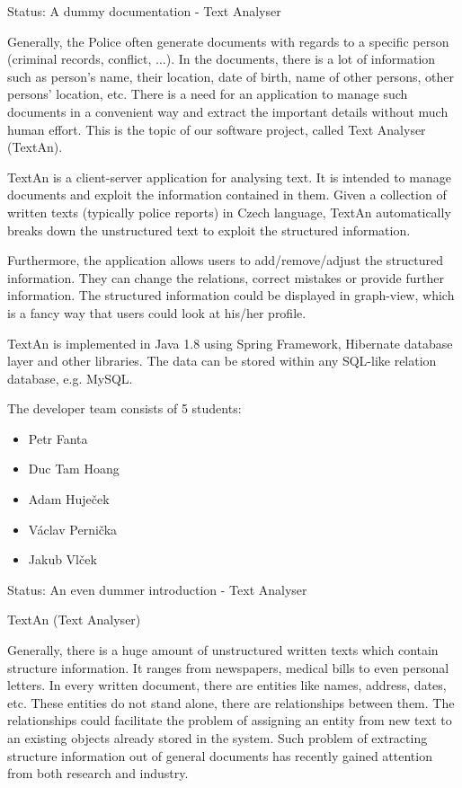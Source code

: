 Status: A dummy documentation - Text Analyser

Generally, the Police often generate documents with regards to a specific person (criminal records, conflict, ...). 
In the documents, there is a lot of information such as
person's name, their location, date of birth, name of other persons, other persons' location, etc.
There is a need for an application to manage such documents in a convenient way and extract the important details without much human effort.
This is the topic of our software project, called Text Analyser (TextAn).

TextAn is a client-server application for analysing text.
It is intended to manage documents and exploit the information contained in them.
Given a collection of written texts (typically police reports) in Czech language,
TextAn automatically breaks down the unstructured text to exploit the structured information. 

Furthermore, the application allows users to add/remove/adjust the structured information.
They can change the relations, correct mistakes or provide further information.
The structured information could be displayed in graph-view,
which is a fancy way that users could look at his/her profile. 

TextAn is implemented in Java 1.8 using Spring Framework, Hibernate database layer and other libraries.
The data can be stored within any SQL-like relation database, e.g. MySQL.

The developer team consists of 5 students:

\begin{itemize}
\itemsep0em
\item Petr Fanta
\item Duc Tam Hoang
\item Adam Huječek
\item Václav Pernička
\item Jakub Vlček
\end{itemize}

Status: An even dummer introduction - Text Analyser

TextAn (Text Analyser)

Generally, there is a huge amount of unstructured written texts which contain structure information.
It ranges from newspapers, medical bills to even personal letters.
In every written document, there are entities like names, address, dates, etc.
These entities do not stand alone, there are relationships between them.
The relationships could facilitate the problem of assigning an entity from new text to an existing objects already stored in the system.
Such problem of extracting structure information out of general documents has recently gained attention from both research and industry.

